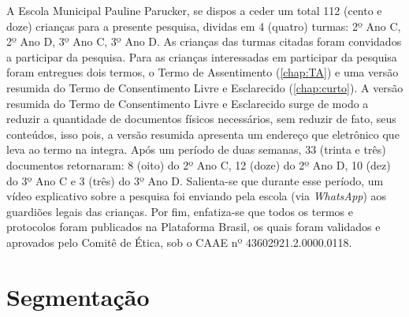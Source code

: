 A Escola Municipal Pauline Parucker, se dispos a ceder um total 112 (cento e doze) crianças para a presente pesquisa, dividas em 4 (quatro) turmas: 2º Ano C, 2º Ano D, 3º Ano C, 3º Ano D. As crianças das turmas citadas foram convidados a participar da pesquisa. Para as crianças interessadas em participar da pesquisa foram entregues dois termos, o Termo de Assentimento (\autoref{chap:TA}) e uma versão resumida do Termo de Consentimento Livre e Esclarecido (\autoref{chap:curto}). A versão resumida do Termo de Consentimento Livre e Esclarecido surge de modo a reduzir a quantidade de documentos físicos necessários, sem reduzir de fato, seus conteúdos, isso pois, a versão resumida apresenta um endereço que eletrônico que leva ao termo na integra. Após um período de duas semanas, 33 (trinta e três) documentos retornaram: 8 (oito) do 2º Ano C, 12 (doze) do 2º Ano D, 10 (dez) do 3º Ano C e 3 (três) do 3º Ano D. Salienta-se que durante esse período, um vídeo explicativo sobre a pesquisa foi enviando pela escola (via \textit{WhatsApp}) aos guardiões legais das crianças. Por fim, enfatiza-se que todos os termos e protocolos foram publicados na Plataforma Brasil, os quais foram validados e aprovados pelo Comitê de Ética, sob o \ac{CAAE} nº 43602921.2.0000.0118.



\section{Segmentação}\label{sec:seg}

